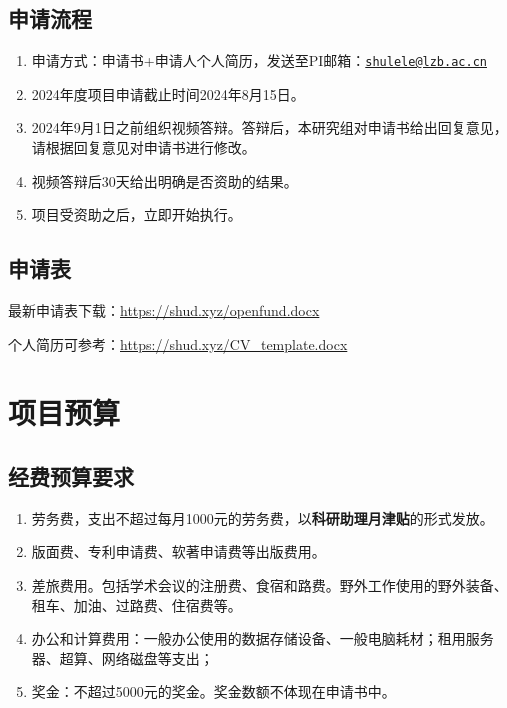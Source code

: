 \documentclass[
]{book}
\providecommand{\tightlist}{%
  \setlength{\itemsep}{0pt}\setlength{\parskip}{0pt}}
\begin{document}
\hypertarget{ux7533ux8bf7ux6d41ux7a0b-1}{%
\section{申请流程}\label{ux7533ux8bf7ux6d41ux7a0b-1}}

\begin{enumerate}
\def\labelenumi{\arabic{enumi}.}
\tightlist
\item
  申请方式：申请书+申请人个人简历，发送至PI邮箱：\href{mailto:shulele@lzb.ac.cn}{\nolinkurl{shulele@lzb.ac.cn}}
\item
  2024年度项目申请截止时间2024年8月15日。
\item
  2024年9月1日之前组织视频答辩。答辩后，本研究组对申请书给出回复意见，请根据回复意见对申请书进行修改。
\item
  视频答辩后30天给出明确是否资助的结果。
\item
  项目受资助之后，立即开始执行。
\end{enumerate}

\hypertarget{ux7533ux8bf7ux8868-1}{%
\section{申请表}\label{ux7533ux8bf7ux8868-1}}

最新申请表下载：\url{https://shud.xyz/openfund.docx}

个人简历可参考：\url{https://shud.xyz/CV_template.docx}

\hypertarget{ux9879ux76eeux9884ux7b97}{%
\chapter{项目预算}\label{ux9879ux76eeux9884ux7b97}}

\hypertarget{ux7ecfux8d39ux9884ux7b97ux8981ux6c42}{%
\section{经费预算要求}\label{ux7ecfux8d39ux9884ux7b97ux8981ux6c42}}

\begin{enumerate}
\def\labelenumi{\arabic{enumi}.}
\tightlist
\item
  劳务费，支出不超过每月1000元的劳务费，以\textbf{科研助理月津贴}的形式发放。
\item
  版面费、专利申请费、软著申请费等出版费用。
\item
  差旅费用。包括学术会议的注册费、食宿和路费。野外工作使用的野外装备、租车、加油、过路费、住宿费等。
\item
  办公和计算费用：一般办公使用的数据存储设备、一般电脑耗材；租用服务器、超算、网络磁盘等支出；
\item
  奖金：不超过5000元的奖金。奖金数额不体现在申请书中。
\end{enumerate}
\end{document}
